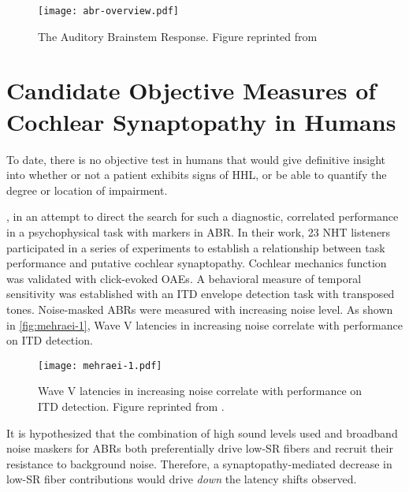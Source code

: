 \begin{figure}[htbp]
	\centering
	\texttt{[image: abr-overview.pdf]}
	\caption[The Auditory Brainstem Response]{The Auditory Brainstem Response.  Figure reprinted from \cite{Durrant2008Manifestations}}
	\label{fig:abr-outline}
\end{figure}

\section{Candidate Objective Measures of Cochlear Synaptopathy in Humans} %
\label{sec:objective_measures_of_cochlear_synaptopathy}
To date, there is no objective test in humans that would give definitive insight into whether or not a patient exhibits signs of HHL, or be able to quantify the degree or location of impairment. 

\cite{Mehraei2015Auditory}, in an attempt to direct the search for such a diagnostic, correlated performance in a psychophysical task with markers in ABR.  In their work, 23 NHT listeners participated in a series of experiments to establish a relationship between task performance and putative cochlear synaptopathy.   Cochlear mechanics function was validated with click-evoked OAEs.  A behavioral measure of temporal sensitivity was established with an ITD envelope detection task with transposed tones.  Noise-masked ABRs were measured with increasing noise level.   As shown in \autoref{fig:mehraei-1}, Wave V latencies in increasing noise correlate with performance on ITD detection.

\begin{figure}[htbp]
	\centering
	\texttt{[image: mehraei-1.pdf]}
	\caption[Wave V latency in noise]{Wave V latencies in increasing noise correlate with performance on ITD detection.  Figure reprinted from \cite{Mehraei2016Auditory}.}
	\label{fig:mehraei-1}
\end{figure}

It is hypothesized that the combination of high sound levels used and broadband noise maskers for ABRs both preferentially drive low-SR fibers and recruit their resistance to background noise.  Therefore, a synaptopathy-mediated decrease in low-SR fiber contributions would drive \emph{down} the latency shifts observed.

